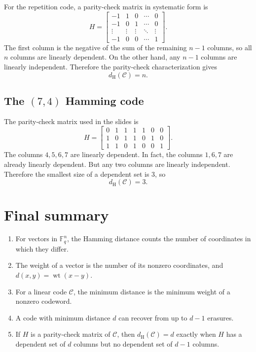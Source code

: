 \documentclass[11pt]{article}
\theoremstyle{definition}
\theoremstyle{remark}
\newcommand{\F}{\mathbb{F}}
\newcommand{\code}{\mathcal{C}}
\newcommand{\wt}{\operatorname{wt}}
\newcommand{\dH}{d_{\mathrm H}}
\begin{document}
For the repetition code, a parity-check matrix in systematic form is
\[
H=
\begin{bmatrix}
-1 & 1 & 0 & \cdots & 0\\
-1 & 0 & 1 & \cdots & 0\\
\vdots & \vdots & \vdots & \ddots & \vdots\\
-1 & 0 & 0 & \cdots & 1
\end{bmatrix}.
\]
The first column is the negative of the sum of the remaining $n-1$ columns, so all $n$ columns are linearly dependent. On the other hand, any $n-1$ columns are linearly independent. Therefore the parity-check characterization gives
\[
\dH(\code)=n.
\]

\subsection{The $(7,4)$ Hamming code}

The parity-check matrix used in the slides is
\[
H=
\begin{bmatrix}
0&1&1&1&1&0&0\\
1&0&1&1&0&1&0\\
1&1&0&1&0&0&1
\end{bmatrix}.
\]
The columns $4,5,6,7$ are linearly dependent. In fact, the columns $1,6,7$ are already linearly dependent. But any two columns are linearly independent. Therefore the smallest size of a dependent set is $3$, so
\[
\dH(\code)=3.
\]

\section{Final summary}

\begin{tcolorbox}[
  colback=softaccent,
  colframe=accent!65,
  boxrule=0.8pt,
  arc=2mm,
  title=Key facts,
  fonttitle=\bfseries,
  coltitle=black
]
\begin{enumerate}[leftmargin=1.5em,itemsep=0.35em]
    \item For vectors in $\F_q^n$, the Hamming distance counts the number of coordinates in which they differ.
    \item The weight of a vector is the number of its nonzero coordinates, and $d(x,y)=\wt(x-y)$.
    \item For a linear code $\code$, the minimum distance is the minimum weight of a nonzero codeword.
    \item A code with minimum distance $d$ can recover from up to $d-1$ erasures.
    \item If $H$ is a parity-check matrix of $\code$, then $\dH(\code)=d$ exactly when $H$ has a dependent set of $d$ columns but no dependent set of $d-1$ columns.
\end{enumerate}
\end{tcolorbox}
\end{document}
